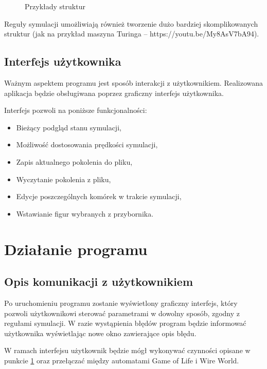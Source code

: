 \documentclass{report}
\begin{document}
\begin{figure}[h]
\centering
\setlength{\fboxsep}{0pt} %
\setlength{\fboxrule}{1pt} %
\caption{Przykłady struktur}
\end{figure}

Reguły symulacji umożliwiają również tworzenie dużo bardziej skomplikowanych struktur (jak na przykład maszyna Turinga -- https://youtu.be/My8AsV7bA94).

\section{Interfejs użytkownika}
\label{sec:opis-interfejs}
Ważnym aspektem programu jest sposób interakcji z użytkownikiem.
Realizowana aplikacja będzie obsługiwana poprzez graficzny interfejs użytkownika.

Interfejs pozwoli na poniższe funkcjonalności:
\begin{itemize}
    \item Bieżący podgląd stanu symulacji,
    \item Możliwość dostosowania prędkości symulacji,
    \item Zapis aktualnego pokolenia do pliku,
    \item Wyczytanie pokolenia z pliku,
    \item Edycje poszczególnych komórek w trakcie symulacji,
    \item Wstawianie figur wybranych z przybornika.
\end{itemize}

\chapter{Działanie programu}

\section{Opis komunikacji z użytkownikiem}
Po uruchomieniu programu zostanie wyświetlony graficzny interfejs, który pozwoli użytkownikowi sterować parametrami w dowolny sposób, zgodny z regułami symulacji. W razie wystąpienia błędów program będzie informować użytkownika wyświetlając nowe okno zawierające opis błędu.

W ramach interfejsu użytkownik będzie mógł wykonywać czynności opisane w punkcie \ref{sec:opis-interfejs}{} oraz przełączać między automatami Game of Life i Wire World.
\end{document}
